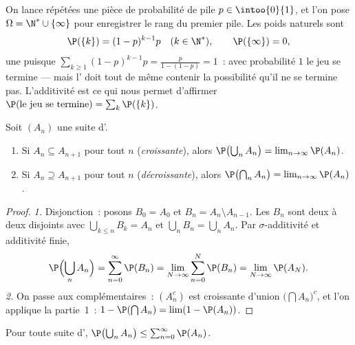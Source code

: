 \begin{example}\label{ex:b2:proba:geometric}
On lance répétées une pièce de probabilité de pile $p \in \intoo{0}{1}$,
et l'on pose $\Omega = \N^* \cup \{\infty\}$ pour enregistrer le rang du
premier pile. Les poids naturels sont
\[
\P(\{k\}) = (1 - p)^{k-1}p
\quad (k \in \N^*),
\qquad
\P(\{\infty\}) = 0 ,
\]
une  puisque $\sum_{k\geq1}(1-p)^{k-1}p =
\frac{p}{1 - (1-p)} = 1$~: avec probabilité $1$ le jeu se termine ---
mais l' doit tout de même contenir la possibilité qu'il ne se
termine pas. L'additivité  est ce qui nous permet d'affirmer
$\P(\text{le jeu se termine}) = \sum_k \P(\{k\})$.
\end{example}

\begin{theorem}\label{thm:b2:proba:continuity}
Soit $(A_n)$ une suite d'.
\begin{enumerate}
\item Si $A_n \subseteq A_{n+1}$ pour tout $n$
(\emph{croissante}), alors
$\P\bigl(\bigcup_n A_n\bigr) = \lim_{n\to\infty} \P(A_n)$.
\item Si $A_n \supseteq A_{n+1}$ pour tout $n$
(\emph{décroissante}), alors
$\P\bigl(\bigcap_n A_n\bigr) = \lim_{n\to\infty} \P(A_n)$.
\end{enumerate}
\end{theorem}

\begin{proof}
\emph{1.} Disjonction~: posons $B_0 = A_0$ et $B_n = A_n \setminus
A_{n-1}$. Les $B_n$ sont deux à deux disjoints avec $\bigcup_{k \leq n}
B_k = A_n$ et $\bigcup_n B_n = \bigcup_n A_n$. Par
$\sigma$-additivité et additivité finie,
\[
\P\Bigl(\bigcup_n A_n\Bigr)
= \sum_{n=0}^\infty \P(B_n)
= \lim_{N\to\infty}\sum_{n=0}^N \P(B_n)
= \lim_{N\to\infty}\P(A_N) .
\]
\emph{2.} On passe aux complémentaires~: $(A_n^c)$ est croissante d'union
$\bigl(\bigcap A_n\bigr)^c$, et l'on applique la partie~1~:
$1 - \P(\bigcap A_n) = \lim (1 - \P(A_n))$.
\end{proof}

\begin{corollary}\label{cor:b2:proba:subadd}
Pour toute suite d', $\P\bigl(\bigcup_n A_n\bigr) \leq
\sum_{n=0}^\infty \P(A_n)$.
\end{corollary}

